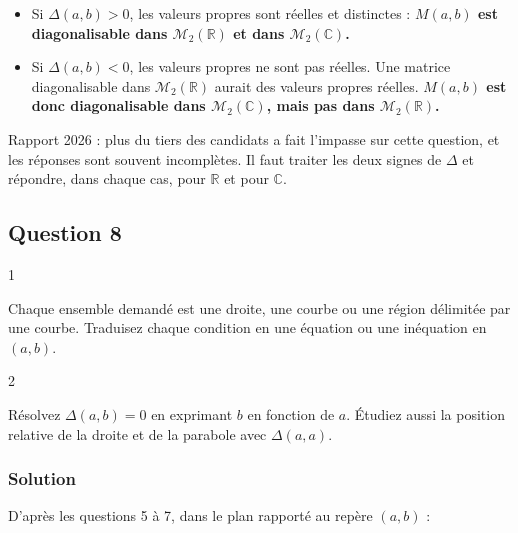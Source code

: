 \documentclass[11pt,a4paper]{article}
\providecommand{\tightlist}{\setlength{\itemsep}{0pt}\setlength{\parskip}{0pt}}
\begin{document}
\begin{itemize}
\tightlist
\item
  Si \(\Delta(a,b)>0\), les valeurs propres sont réelles et distinctes : \textbf{\(M(a,b)\) est diagonalisable dans \({\mathcal{M}}_2(\mathbb{R})\) et dans \({\mathcal{M}}_2(\mathbb{C})\).}
\item
  Si \(\Delta(a,b)<0\), les valeurs propres ne sont pas réelles. Une matrice diagonalisable dans \({\mathcal{M}}_2(\mathbb{R})\) aurait des valeurs propres réelles. \textbf{\(M(a,b)\) est donc diagonalisable dans \({\mathcal{M}}_2(\mathbb{C})\), mais pas dans \({\mathcal{M}}_2(\mathbb{R})\).}
\end{itemize}

\begin{jury}

Rapport 2026 : plus du tiers des candidats a fait l'impasse sur cette question, et les réponses sont souvent incomplètes. Il faut traiter les deux signes de \(\Delta\) et répondre, dans chaque cas, pour \(\mathbb{R}\) et pour \(\mathbb{C}\).

\end{jury}

\hypertarget{question-8}{%
\subsection{Question 8}\label{question-8}}

\begin{indication}{1}

Chaque ensemble demandé est une droite, une courbe ou une région délimitée par une courbe. Traduisez chaque condition en une équation ou une inéquation en \((a,b)\).

\end{indication}

\begin{indication}{2}

Résolvez \(\Delta(a,b)=0\) en exprimant \(b\) en fonction de \(a\). Étudiez aussi la position relative de la droite et de la parabole avec \(\Delta(a,a)\).

\end{indication}

\hypertarget{solution-9}{%
\subsubsection{Solution}\label{solution-9}}

D'après les questions 5 à 7, dans le plan rapporté au repère \((a,b)\) :
\end{document}
